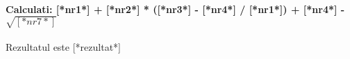 \documentclass{exam}
\begin{document}
\paragraph{
Calculati: [*nr1*] + [*nr2*] * ([*nr3*] - [*nr4*] / [*nr1*]) + [*nr4*] - $\sqrt{[*nr7*]}$\\
}
Rezultatul este [*rezultat*]
\end{document}
